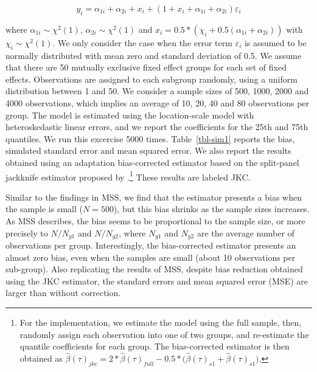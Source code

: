 \documentclass[
  authoryear,
  review,
  1p]{elsarticle}
\begin{document}
\[y_i = \alpha_{1i} + \alpha_{2i} + x_i + (1+x_i + \alpha_{1i} + \alpha_{2i} ) \varepsilon_i
\]

where \(\alpha_{1i}\sim \chi^2(1)\), \(\alpha_{2i} \sim \chi^2(1)\) and
\(x_i = 0.5 * (\chi_i +0.5(\alpha_{1i}+\alpha_{2i}))\) with
\(\chi_i \sim \chi^2(1)\). We only consider the case when the error term
\(\varepsilon_i\) is assumed to be normally distributed with mean zero
and standard deviation of 0.5. We assume that there are 50 mutually
exclusive fixed effect groups for each set of fixed effects.
Observations are assigned to each subgroup randomly, using a uniform
distribution between 1 and 50. We consider a sample sizes of 500, 1000,
2000 and 4000 observations, which implies an average of 10, 20, 40 and
80 observations per group. The model is estimated using the
location-scale model with heteroskedastic linear errors, and we report
the coefficients for the 25th and 75th quantiles. We run this excercise
5000 times. Table~\ref{tbl-sim1} reports the bias, simulated standard
error and mean squared error. We also report the results obtained using
an adaptation bias-corrected estimator based on the split-panel
jackknife estimator proposed by \citet{dhaene2015}.\footnote{For the
  implementation, we estimate the model using the full sample, then,
  randomly assign each observation into one of two groups, and
  re-estimate the quantile coefficients for each group. The
  bias-corrected estimator is then obtained as
  \(\hat\beta(\tau)_{jkc}=2*\hat\beta(\tau)_{full}-0.5*\big(\hat\beta(\tau)_{s1}+\hat\beta(\tau)_{s1}\big)\).}
These results are labeled JKC.

Similar to the findings in MSS, we find that the estimator presents a
bias when the sample is small (\(N=500\)), but this bias shrinks as the
sample sizes increases. As MSS describes, the bias seems to be
proportional to the sample size, or more precisely to \(N/N_{g1}\) and
\(N/N_{g2}\), where \(N_{g1}\) and \(N_{g2}\) are the average number of
observations per group. Interestingly, the bias-corrected estimator
presents an almost zero bias, even when the samples are small (about 10
observations per sub-group). Also replicating the results of MSS,
despite bias reduction obtained using the JKC estimator, the standard
errors and mean squared error (MSE) are larger than without correction.
\end{document}

